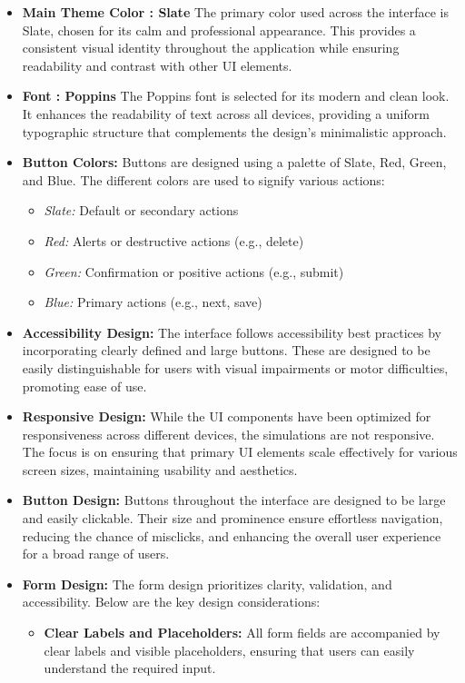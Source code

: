 \begin{itemize} 
    \item \textbf{Main Theme Color : Slate} The primary color used across the interface is Slate, chosen for its calm and professional appearance. This provides a consistent visual identity throughout the application while ensuring readability and contrast with other UI elements. 
    \item \textbf{Font : Poppins} The Poppins font is selected for its modern and clean look. It enhances the readability of text across all devices, providing a uniform typographic structure that complements the design's minimalistic approach.
    \item \textbf{Button Colors:}  
    Buttons are designed using a palette of Slate, Red, Green, and Blue. The different colors are used to signify various actions:  
    \begin{itemize}
        \item \textit{Slate:} Default or secondary actions
        \item \textit{Red:} Alerts or destructive actions (e.g., delete)
        \item \textit{Green:} Confirmation or positive actions (e.g., submit)
        \item \textit{Blue:} Primary actions (e.g., next, save)
    \end{itemize}
    \item \textbf{Accessibility Design:} The interface follows accessibility best practices by incorporating clearly defined and large buttons. These are designed to be easily distinguishable for users with visual impairments or motor difficulties, promoting ease of use.
     \item \textbf{Responsive Design:} While the UI components have been optimized for responsiveness across different devices, the simulations are not responsive. The focus is on ensuring that primary UI elements scale effectively for various screen sizes, maintaining usability and aesthetics.
    \item \textbf{Button Design:} Buttons throughout the interface are designed to be large and easily clickable. Their size and prominence ensure effortless navigation, reducing the chance of misclicks, and enhancing the overall user experience for a broad range of users.
    \item \textbf{Form Design:} The form design prioritizes clarity, validation, and accessibility. Below are the key design considerations:
     \begin{itemize}
        \item \textbf{Clear Labels and Placeholders:} 
        All form fields are accompanied by clear labels and visible placeholders, ensuring that users can easily understand the required input.
        

\end{itemize}
\end{itemize}
